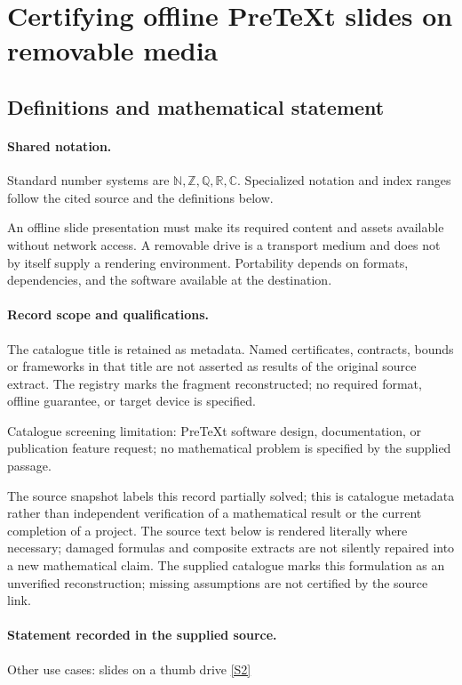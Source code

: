 \documentclass[11pt]{article}
\newcommand{\sref}[2]{\hyperlink{source:#1:#2}{[S#2]}}
\begin{document}
\section{Certifying offline PreTeXt slides on removable media}\label{statement}

\subsection{Definitions and mathematical statement}

\paragraph{Shared notation.}Standard number systems are $\mathbb N,\mathbb Z,\mathbb Q,\mathbb R,\mathbb C$. Specialized notation and index ranges follow the cited source and the definitions below.


An offline slide presentation must make its required content and assets available without network access. A removable drive is a transport medium and does not by itself supply a rendering environment. Portability depends on formats, dependencies, and the software available at the destination.
\paragraph{Record scope and qualifications.}
The catalogue title is retained as metadata. Named certificates, contracts, bounds or frameworks in that title are not asserted as results of the original source extract.
The registry marks the fragment reconstructed; no required format, offline guarantee, or target device is specified.

Catalogue screening limitation: PreTeXt software design, documentation, or publication feature request; no mathematical problem is specified by the supplied passage.

The source snapshot labels this record partially solved; this is catalogue metadata rather than independent verification of a mathematical result or the current completion of a project.
The source text below is rendered literally where necessary; damaged formulas and composite extracts are not silently repaired into a new mathematical claim.
The supplied catalogue marks this formulation as an unverified reconstruction; missing assumptions are not certified by the source link.
\paragraph{Statement recorded in the supplied source.}
Other use cases: slides on a thumb drive \sref{statement}{2}
\end{document}
